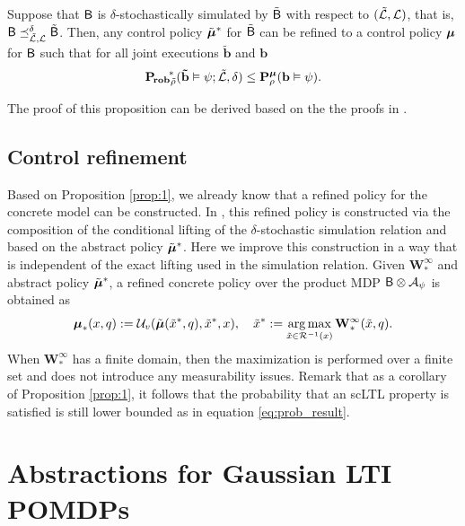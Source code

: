 \documentclass{ifacconf}
\begin{document}
\begin{prop}\label{prop:1}
  Suppose that $\mathsf{B}$ is $\delta$-stochastically simulated by $\tilde {\mathsf{B}}$ with respect to $({\tilde{\mathcal{L}},\mathcal{L}})$, that is, ${\mathsf{B}}\preceq^{\delta}_{\tilde{\mathcal{L}},\mathcal{L}} \tilde {\mathsf{B}}$. Then, any control policy ${\tilde {{\boldsymbol{\mu}}}}^\ast$ for $\tilde {\mathsf{B}}$ can be refined to a control policy ${\boldsymbol{\mu}}$ for $\mathsf{B}$ such that for all joint executions $\mathbf{\tilde b}$ and $\mathbf{b}$
  \begin{equation}
  \label{eq:prob_result}
    \mathbf{P_{\! rob}}_{\tilde {\rho}}^{\!\ast}(\mathbf{\tilde b} \vDash\psi; \tilde{\mathcal{L}},\delta)\leq  \mathbf P _{\rho}^{{\boldsymbol{\mu}}}( \mathbf{b} \vDash\psi).
  \end{equation}
\end{prop}

The proof of this proposition can be derived based on the the proofs in \citep{tech_report_TACAS}.


\subsection{Control refinement}
\label{sec:control}

Based on Proposition \ref{prop:1}, we already know that a refined policy for the concrete model can be constructed. In \cite{tech_report_TACAS}, this refined policy is constructed via the composition of the conditional lifting of the $\delta$-stochastic simulation relation and based on the abstract policy $\tilde  {{\boldsymbol{\mu}}}^\ast$. Here we improve this construction in a way that is independent of the exact lifting used in the simulation relation. Given $\mathbf{W}^\infty_\ast$ and abstract policy $\tilde {{\boldsymbol{\mu}}}^\ast$, a refined concrete policy over the product MDP $\mathsf{B}\otimes\mathcal{A}_\psi$ is obtained as
\begin{equation*}
		{\boldsymbol{\mu}}_\ast(x,q): = \mathcal{U}_{v}( \tilde{{\boldsymbol{\mu}}}(\tilde x^*, q), \tilde x^*, x), \quad \tilde x^*:=\operatorname*{arg\,max}_{ \tilde x\in
		\mathcal{R}^{-1}(x)} \mathbf  W^\infty_\ast(\tilde x,q).
\end{equation*}
When  $\mathbf  W^\infty_\ast$ has a finite domain, then the maximization is performed over a finite set and does not introduce any measurability issues. 
Remark that as a corollary of Proposition \ref{prop:1}, it follows that the probability that an scLTL property is satisfied is still lower bounded as in equation \eqref{eq:prob_result}.
 

\section{Abstractions for Gaussian LTI POMDPs}
\label{sec:gaussian}
\end{document}
